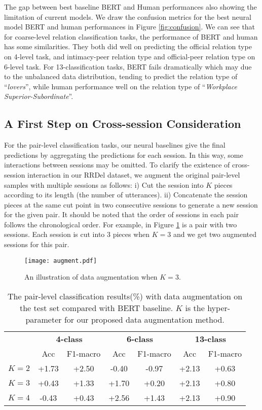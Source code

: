 \documentclass[letterpaper]{article} \usepackage{aaai21}  \usepackage{times}  \usepackage{helvet} \usepackage{courier}  \usepackage[hyphens]{url}  \usepackage{graphicx} \usepackage{xcolor}
\begin{document}
The gap between best baseline BERT and Human performances also showing the limitation of current models. We draw the confusion metrics for the best neural model BERT and human performances in Figure \ref{fig:confusion}. We can see that for coarse-level relation classification tasks, the performance of BERT and human has some similarities. They both did well on predicting the official relation type on 4-level task, and intimacy-peer relation type and official-peer relation type on 6-level task. For 13-classification tasks, BERT fails dramatically which may due to the unbalanced data distribution, tending to predict the relation type of ``{\em lovers}'', while human performance well on the relation type of ``{\em Workplace Superior-Subordinate}''.

\subsection{A First Step on Cross-session Consideration}
\label{sec:cross}

For the pair-level classification tasks, our neural baselines give the final predictions by aggregating the predictions for each session. In this way, some interactions between sessions may be omitted. To clarify the existence of cross-session interaction in our RRDel dataset, we augment the original pair-level samples with multiple sessions as follows: i) Cut the session into $K$ pieces according to its length (the number of utterances). ii) Concatenate the session pieces at the same cut point in two consecutive sessions to generate a new session for the given pair. It should be noted that the order of sessions in each pair follows the chronological order. For example, in Figure \ref{fig:augment} is a pair with two sessions. Each session is cut into 3 pieces when $K=3$ and we get two augmented sessions for this pair.
\begin{figure}[t!]
	\centering
	\texttt{[image: augment.pdf]}
	\caption{An illustration of data augmentation when $K=3$. }
	\label{fig:augment}
\end{figure}


\begin{table}[th]
	\centering
	\scriptsize
	\begin{tabular}{@{}lcccccc@{}}
		\toprule[1.5pt]
		& \multicolumn{2}{c}{\textbf{4-class}} & \multicolumn{2}{c}{\textbf{6-class}} & \multicolumn{2}{c}{\textbf{13-class}} \\ 
		& Acc & F1-macro                 & Acc & F1-macro                  & Acc & F1-macro \\
		\midrule
$K=2$   &+1.73 &+2.50  &-0.40& -0.97& +2.13 & +0.63 \\		
		$K=3$    &+0.43 &+1.33 &+1.70 &+0.20 &+2.13 &+0.80 \\
		$K=4$    &-0.43 &+0.43 &+2.56 &+1.43 &+2.13 &+0.90 \\
		\bottomrule[1.5pt]
		
	\end{tabular}
	\caption{The pair-level classification results(\%) with data augmentation on the test set compared with BERT baseline. $K$ is the hyper-parameter for our proposed data augmentation method.}
	\label{tab:cross}
\end{table}
\end{document}

